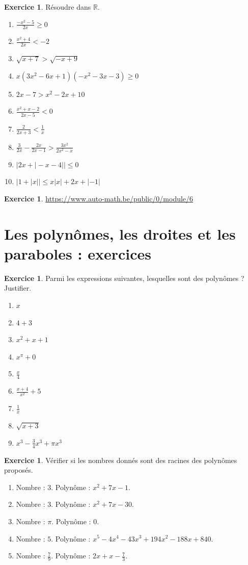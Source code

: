 \documentclass[a4paper,13pt]{scrreprt}
\theoremstyle{plain}
\theoremstyle{definition}
\newtheorem{exo}[subsection]{Exercice}
\newcommand{\rr}{\mathbb{R}}
\begin{document}
\begin{exo} \label{exoei6}
	Résoudre dans $\rr$.
	\begin{enumerate}
		\item $\frac{-x^2-5}{2x} \ge 0$
		\item $\frac{x^2+4}{2x} < -2$
		\item $\sqrt{x+7} > \sqrt{-x+9}$
		\item $x(3x^2-6x+1)(-x^2-3x-3) \ge 0$
		\item $2x-7 > x^2 - 2x +10$
		\item $\frac{x^2+x-2}{2x-5}<0$
		\item $\frac{2}{2x+3} < \frac{1}{x}$
		\item $\frac{3}{2x} - \frac{2x}{2x-1} > \frac{3x^2}{2x^2-x}$
		\item $|2x+|-x-4|| \le 0$
		\item $|1+|x|| \le x|x|+2x+|-1|$
	\end{enumerate}
\end{exo}

\begin{exo} \label{exoei7}
	\url{https://www.auto-math.be/public/0/module/6}
\end{exo}

\section{Les polynômes, les droites et les paraboles : exercices}

\begin{exo} \label{exop1}
	Parmi les expressions suivantes, lesquelles sont des polynômes ? Justifier.
	\begin{enumerate}
		\item $x$
		\item $4+3$
		\item $x^2+x+1$
		\item $x^{\pi} +0$
		\item $\frac{x}{4}$
		\item $\frac{x+4}{x^2}+5$
		\item $\frac{1}{x}$
		\item $\sqrt{x+3}$
		\item $x^3 - \frac{3}{4} x^3 + \pi {x^3}$
	\end{enumerate}
\end{exo}

\begin{exo} \label{exop2}
	Vérifier si les nombres donnés sont des racines des polynômes proposés.
	\begin{enumerate}
		\item Nombre : $3$. Polynôme : $x^2+7x-1$.
		\item Nombre : $3$. Polynôme : $x^2+7x-30$.
		\item Nombre : $\pi$. Polynôme : $0$.
		\item Nombre : $5$. Polynôme : $x^5 - 4x^4 -43x^3 + 194 x^2 -188x + 840$.
		\item Nombre : $\frac{7}{9}$. Polynôme : $2x +x - \frac{7}{3}$.
	\end{enumerate}
\end{exo}
\end{document}
